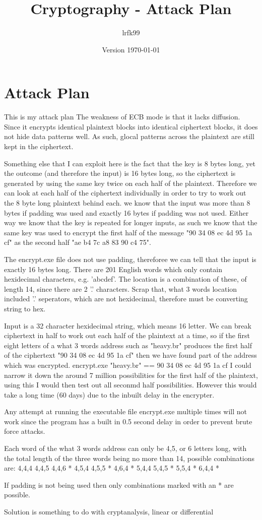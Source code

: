 \documentclass[a4paper, 11pt]{article}
\title{Cryptography - Attack Plan}
\date{Version \today}
\author{lrfk99}
\begin{document}
\maketitle

\section{Attack Plan}

This is my attack plan
The weakness of ECB mode is that it lacks diffusion. Since it encrypts identical plaintext blocks into 
identical ciphertext blocks, it does not hide data patterns well. 
As such, glocal patterns across the plaintext are still kept in the ciphertext.

Something else that I can exploit here is the fact that the key is 8 bytes long, 
yet the outcome (and therefore the input) is 16 bytes long, 
so the ciphertext is generated by using the same key twice on each half of the plaintext.
Therefore we can look at each half of the ciphertext individually in order to try to work out the 8 byte long plaintext behind each.
we know that the input was more than 8 bytes if padding was used 
and exactly 16 bytes if padding was not used.
Either way we know that the key is repeated for longer inputs, as such we know that the same key was used to 
encrypt the first half of the message "90 34 08 ec 4d 95 1a cf" as the second half "ae b4 7c a8 83 90 c4 75".

The encrypt.exe file does not use padding, thereforee we can tell that the input is exactly 16 bytes long.
There are 201 English words which only contain hexidecimal characters, e.g. 'abcdef'. The location is a combination of these, 
of length 14, since there are 2 '.' characters.
Scrap that, what 3 words location included '.' seperators, which are not hexidecimal, therefore must be converting string to hex.


Input is a 32 character hexidecimal string, which means 16 letter.
We can break ciphertext in half to work out each half of the plaintext at a time, so if the first eight letters of a what 3 words 
address such as "heavy.br" produces the first half of the ciphertext "90 34 08 ec 4d 95 1a cf" then we have found part of the 
address which was encrypted.
encrypt.exe "heavy.br" == 90 34 08 ec 4d 95 1a cf 
I could narrow it down the around 7 million possibilities for the first half of the plaintext, using this I would then 
test out all seconmd half possibilities. However this would take a long time (60 days) due to the inbuilt delay in the encrypter.

Any attempt at running the executable file encrypt.exe multiple times will not work since the program has a built in 
0.5 second delay in order to prevent brute force attacks.

Each word of the what 3 words address can only be 4,5, or 6 letters long, with the total length of the three words being no more than 14, 
possible combinations are:
4,4,4
4,4,5
4,4,6 *
4,5,4
4,5,5 *
4,6,4 *
5,4,4
5,4,5 *
5,5,4 *
6,4,4 *

If padding is not being used then only combinations marked with an * are possible.

Solution is something to do with cryptanalysis, linear or differential
\end{document}
